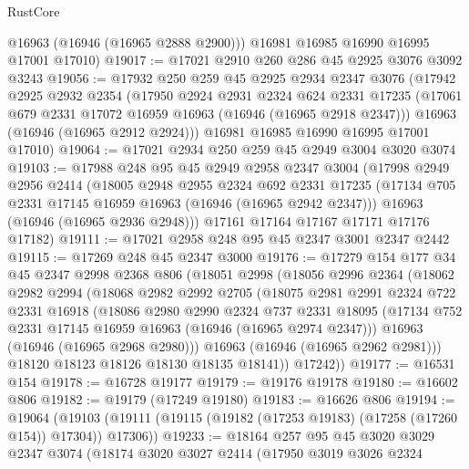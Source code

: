 \begin{lexlean}{RustCore}
\begin{coremodule}
        @16963
        (@16946 (@16965 @2888 @2900)))
      @16981
      @16985
      @16990
      @16995
      @17001
      @17010)
@19017 := @17021 @2910 @260 @286 @45 @2925 @3076 @3092 @3243
@19056 := @17932
    @250
    @259
    @45
    @2925
    @2934
    @2347
    @3076
    (@17942
      @2925
      @2932
      @2354
      (@17950
        @2924
        @2931
        @2324
        @624
        @2331
        @17235
        (@17061 @679 @2331 @17072 @16959 @16963 (@16946 (@16965 @2918 @2347)))
        @16963
        (@16946 (@16965 @2912 @2924)))
      @16981
      @16985
      @16990
      @16995
      @17001
      @17010)
@19064 := @17021 @2934 @250 @259 @45 @2949 @3004 @3020 @3074
@19103 := @17988
    @248
    @95
    @45
    @2949
    @2958
    @2347
    @3004
    (@17998
      @2949
      @2956
      @2414
      (@18005
        @2948
        @2955
        @2324
        @692
        @2331
        @17235
        (@17134 @705 @2331 @17145 @16959 @16963 (@16946 (@16965 @2942 @2347)))
        @16963
        (@16946 (@16965 @2936 @2948)))
      @17161
      @17164
      @17167
      @17171
      @17176
      @17182)
@19111 := @17021 @2958 @248 @95 @45 @2347 @3001 @2347 @2442
@19115 := @17269 @248 @45 @2347 @3000
@19176 := @17279
    @154
    @177
    @34
    @45
    @2347
    @2998
    @2368
    @806
    (@18051
      @2998
      (@18056
        @2996
        @2364
        (@18062
          @2982
          @2994
          (@18068
            @2982
            @2992
            @2705
            (@18075
              @2981
              @2991
              @2324
              @722
              @2331
              @16918
              (@18086
                @2980
                @2990
                @2324
                @737
                @2331
                @18095
                (@17134 @752 @2331 @17145 @16959 @16963 (@16946 (@16965 @2974 @2347)))
                @16963
                (@16946 (@16965 @2968 @2980)))
              @16963
              (@16946 (@16965 @2962 @2981)))
            @18120
            @18123
            @18126
            @18130
            @18135
            @18141))
        @17242))
@19177 := @16531 @154
@19178 := @16728 @19177
@19179 := @19176 @19178
@19180 := @16602 @806
@19182 := @19179 (@17249 @19180)
@19183 := @16626 @806
@19194 := @19064
    (@19103 (@19111 (@19115 (@19182 (@17253 @19183) (@17258 (@17260 @154)) @17304)) @17306))
@19233 := @18164
    @257
    @95
    @45
    @3020
    @3029
    @2347
    @3074
    (@18174
      @3020
      @3027
      @2414
      (@17950
        @3019
        @3026
        @2324

\end{coremodule}
\end{lexlean}
